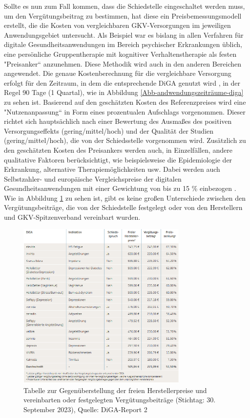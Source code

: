 \documentclass{article}
\begin{document}
			Sollte es nun zum Fall kommen, dass die Schiedstelle eingeschaltet werden muss, um den Vergütungsbeitrag zu bestimmen, hat diese ein Preisbemessungsmodell erstellt, die die Kosten von vergleichbaren GKV-Versorgungen im jeweiligen Anwendungsgebiet untersucht. Als Beispiel war es bislang in allen Verfahren für digitale Gesundheitsanwendungen im Bereich psychischer Erkrankungen üblich, eine persönliche Gruppentherapie mit kognitiver Verhaltenstherapie als festen "Preisanker`` anzunehmen. Diese Methodik wird auch in den anderen Bereichen angewendet. Die genaue Kostenberechnung für die vergleichbare Versorgung erfolgt für den Zeitraum, in dem die entsprechende DiGA genutzt wird \cite[vgl. S. 13]{TK-Report-2}, in der Regel 90 Tage (1 Quartal), wie in Abbildung \ref{Abb-andwendungszeiträume-diga} zu sehen ist. Basierend auf den geschätzten Kosten des Referenzpreises wird eine "Nutzenanpassung`` in Form eines prozentualen Aufschlags vorgenommen. Dieser richtet sich hauptsächlich nach einer Bewertung des Ausmaßes des positiven Versorgungseffekts (gering/mittel/hoch) und der Qualität der Studien (gering/mittel/hoch), die von der Schiedsstelle vorgenommen wird. Zusätzlich zu den geschätzten Kosten des Preisankers werden auch, in Einzelfällen, andere qualitative Faktoren berücksichtigt, wie beispielsweise die Epidemiologie der Erkrankung, alternative Therapiemöglichkeiten usw. Dabei werden auch Selbstzahler- und europäische Vergleichspreise der digitalen Gesundheitsanwendungen mit einer Gewichtung von bis zu 15 \% einbezogen \cite[vgl. S. 13]{TK-Report-2}. Wie in Abbildung \ref{Tab-preise-diga} zu sehen ist, gibt es keine großen Unterschiede zwischen den Vergütungsbeiträge, die von der Schiedstelle festgelegt oder von den Herstellern und GKV-Spitzenverband vereinbart wurden. 
			\begin{figure}[htbp]
				\centering
				\includegraphics[width=0.75\textwidth]{./grafiken/tabelle_preise_diga}
				\caption[Gegenüberstellung der freien Herstellerpreise und vereinbarten oder festgelegten Vergütungsbeiträge]{Tabelle zur Gegenüberstellung der freien Herstellerpreise und vereinbarten oder festgelegten Vergütungsbeiträge (Stichtag: 30. September 2023), Quelle: DiGA-Report 2 \cite{TK-Report-2}}
				\label{Tab-preise-diga}
			\end{figure}
\end{document}
